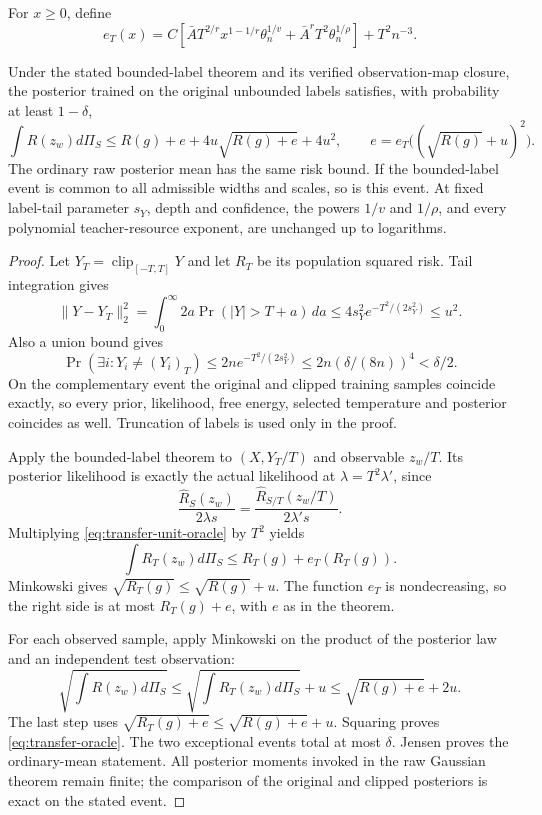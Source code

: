 For $x\ge0$, define
\begin{equation}
 e_T(x)=C\left[
 \bar A T^{2/r}x^{1-1/r}\theta_n^{1/v}
       +\bar A^rT^2\theta_n^{1/\rho}\right]+T^2n^{-3}.
 \label{eq:transfer-remainder}
\end{equation}
\begin{theorem}
\label{thm:subgaussian-adaptive-transfer}
Under the stated bounded-label theorem and its verified observation-map closure, the posterior trained on the original unbounded labels satisfies, with probability at least $1-\delta$,
\begin{equation}
 \int R(z_w)d\Pi_S
 \le R(g)+e+4u\sqrt{R(g)+e}+4u^2,
 \qquad e=e_T\big((\sqrt{R(g)}+u)^2\big).
 \label{eq:transfer-oracle}
\end{equation}
The ordinary raw posterior mean has the same risk bound. If the bounded-label event is common to all admissible widths and scales, so is this event. At fixed label-tail parameter $s_Y$, depth and confidence, the powers $1/v$ and $1/\rho$, and every polynomial teacher-resource exponent, are unchanged up to logarithms.
\end{theorem}
\begin{proof}
Let $Y_T=\operatorname{clip}_{[-T,T]}Y$ and let $R_T$ be its population squared risk. Tail integration gives
\[
 \|Y-Y_T\|_2^2
 =\int_0^\infty2a\Pr(|Y|>T+a)\,da
 \le4s_Y^2e^{-T^2/(2s_Y^2)}\le u^2.
\]
Also a union bound gives
\[
 \Pr(\exists i:Y_i\ne(Y_i)_T)
 \le2ne^{-T^2/(2s_Y^2)}
 \le2n(\delta/(8n))^4<\delta/2.
\]
On the complementary event the original and clipped training samples coincide exactly, so every prior, likelihood, free energy, selected temperature and posterior coincides as well. Truncation of labels is used only in the proof.

Apply the bounded-label theorem to $(X,Y_T/T)$ and observable $z_w/T$. Its posterior likelihood is exactly the actual likelihood at $\lambda=T^2\lambda'$, since
\[
 \frac{\widehat R_S(z_w)}{2\lambda s}
 =\frac{\widehat R_{S/T}(z_w/T)}{2\lambda' s}.
\]
Multiplying \eqref{eq:transfer-unit-oracle} by $T^2$ yields
\[
 \int R_T(z_w)d\Pi_S\le R_T(g)+e_T(R_T(g)).
\]
Minkowski gives $\sqrt{R_T(g)}\le\sqrt{R(g)}+u$.
The function $e_T$ is nondecreasing, so the right side is at most
$R_T(g)+e$, with $e$ as in the theorem.

For each observed sample, apply Minkowski on the product of the posterior law and an independent test observation:
\[
 \sqrt{\int R(z_w)d\Pi_S}
 \le\sqrt{\int R_T(z_w)d\Pi_S}+u
 \le\sqrt{R(g)+e}+2u.
\]
The last step uses $\sqrt{R_T(g)+e}\le\sqrt{R(g)+e}+u$.
Squaring proves \eqref{eq:transfer-oracle}. The two exceptional events total at most $\delta$. Jensen proves the ordinary-mean statement. All posterior moments invoked in the raw Gaussian theorem remain finite; the comparison of the original and clipped posteriors is exact on the stated event.
\end{proof}


